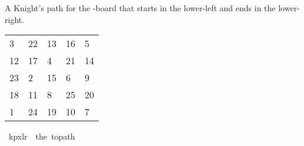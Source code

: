 \begin{isabellebody}
\begin{isamarkuptext}%
A Knight's path for the -board that starts in the lower-left and ends in the 
lower-right.
  \begin{table}[H]
    \begin{tabular}{lllll}
       3 & 22 & 13 & 16 &  5 \\
      12 & 17 &  4 & 21 & 14 \\
      23 &  2 & 15 &  6 &  9 \\
      18 & 11 &  8 & 25 & 20 \\
       1 & 24 & 19 & 10 &  7
    \end{tabular}
  \end{table}%
\end{isamarkuptext}\isamarkuptrue%
\isamarkupfalse%
\ {\isachardoublequoteopen}kp{}x{}lr\ {\isasymequiv}\ the\ {\isacharparenleft}{\kern0pt}to{\isacharunderscore}{\kern0pt}path\ \isanewline
\ \ {\isacharbrackleft}{\kern0pt}{\isacharbrackleft}{\kern0pt}{}{\isacharcomma}{\kern0pt}{}{}{\isacharcomma}{\kern0pt}{}{}{\isacharcomma}{\kern0pt}{}{}{\isacharcomma}{\kern0pt}{}{\isacharbrackright}{\kern0pt}{\isacharcomma}{\kern0pt}\isanewline
\ \ {\isacharbrackleft}{\kern0pt}{}{}{\isacharcomma}{\kern0pt}{}{}{\isacharcomma}{\kern0pt}{}{\isacharcomma}{\kern0pt}{}{}{\isacharcomma}{\kern0pt}{}{}{\isacharbrackright}{\kern0pt}{\isacharcomma}{\kern0pt}\isanewline
\ \ {\isacharbrackleft}{\kern0pt}{}{}{\isacharcomma}{\kern0pt}{}{\isacharcomma}{\kern0pt}{}{}{\isacharcomma}{\kern0pt}{}{\isacharcomma}{\kern0pt}{}{\isacharbrackright}{\kern0pt}{\isacharcomma}{\kern0pt}\isanewline
\ \ {\isacharbrackleft}{\kern0pt}{}{}{\isacharcomma}{\kern0pt}{}{}{\isacharcomma}{\kern0pt}{}{\isacharcomma}{\kern0pt}{}{}{\isacharcomma}{\kern0pt}{}{}{\isacharbrackright}{\kern0pt}{\isacharcomma}{\kern0pt}\isanewline
\ \ {\isacharbrackleft}{\kern0pt}{}{\isacharcomma}{\kern0pt}{}{}{\isacharcomma}{\kern0pt}{}{}{\isacharcomma}{\kern0pt}{}{}{\isacharcomma}{\kern0pt}{}{\isacharbrackright}{\kern0pt}{\isacharbrackright}{\kern0pt}{\isacharparenright}{\kern0pt}{\isachardoublequoteclose}\isanewline

\end{isabellebody}
